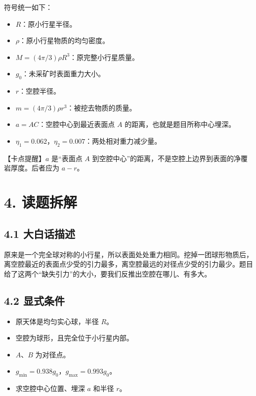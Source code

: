 \documentclass[
  11pt,
  UTF8]{ctexart}
\providecommand{\tightlist}{%
  \setlength{\itemsep}{0pt}\setlength{\parskip}{0pt}}
\begin{document}
符号统一如下：

\begin{itemize}
\tightlist
\item
  \(R\)：原小行星半径。
\item
  \(ρ\)：原小行星物质的均匀密度。
\item
  \(M=(4π/3)ρR^3\)：原完整小行星质量。
\item
  \(g_0\)：未采矿时表面重力大小。
\item
  \(r\)：空腔半径。
\item
  \(m=(4π/3)ρr^3\)：被挖去物质的质量。
\item
  \(a=AC\)：空腔中心到最近表面点 \(A\) 的距离，也就是题目所称中心埋深。
\item
  \(η_1=0.062\)，\(η_2=0.007\)：两处相对重力减少量。
\end{itemize}

【卡点提醒】\(a\) 是``表面点 \(A\)
到空腔中心''的距离，不是空腔上边界到表面的净覆岩厚度。后者应为 \(a-r\)。

\hypertarget{ux8bfbux9898ux62c6ux89e3}{%
\section{4. 读题拆解}\label{ux8bfbux9898ux62c6ux89e3}}

\hypertarget{ux5927ux767dux8bddux63cfux8ff0}{%
\subsection{4.1 大白话描述}\label{ux5927ux767dux8bddux63cfux8ff0}}

原来是一个完全球对称的小行星，所以表面处处重力相同。挖掉一团球形物质后，离空腔最近的表面点少受的引力最多，离空腔最远的对径点少受的引力最少。题目给了这两个``缺失引力''的大小，要我们反推出空腔在哪儿、有多大。

\hypertarget{ux663eux5f0fux6761ux4ef6}{%
\subsection{4.2 显式条件}\label{ux663eux5f0fux6761ux4ef6}}

\begin{itemize}
\tightlist
\item
  原天体是均匀实心球，半径 \(R\)。
\item
  空腔为球形，且完全位于小行星内部。
\item
  \(A\)、\(B\) 为对径点。
\item
  \(g_{\min}=0.938g_0\)，\(g_{\max}=0.993g_0\)。
\item
  求空腔中心位置、埋深 \(a\) 和半径 \(r\)。
\end{itemize}
\end{document}
